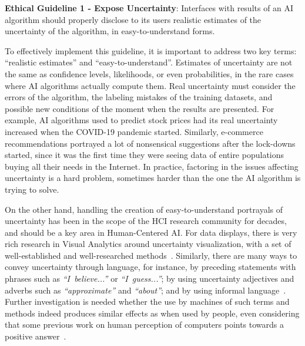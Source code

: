 \documentclass{article}
\begin{document}
\noindent \textbf{Ethical Guideline 1 - Expose Uncertainty}: Interfaces with results of an AI algorithm should properly disclose to its users realistic estimates of the uncertainty of the algorithm, in easy-to-understand forms.

To effectively implement this guideline, it is important to address two key terms: ``realistic estimates'' and ``easy-to-understand''. Estimates of uncertainty are not the same as confidence levels, likelihoods, or even probabilities, in the rare cases where AI algorithms actually compute them. Real uncertainty must consider the errors of the algorithm, the labeling mistakes of the training datasets, and possible new conditions of the moment when the results are presented. For example, AI algorithms used to predict stock prices had its real uncertainty increased when the COVID-19 pandemic started. Similarly, e-commerce recommendations portrayed a lot of nonsensical suggestions after the lock-downs started, since it was the first time they were seeing data of entire populations buying all their needs in the Internet. In practice, factoring in the issues affecting uncertainty is a hard problem, sometimes harder than the one the AI algorithm is trying to solve.

On the other hand, handling the creation of easy-to-understand portrayals of uncertainty has been in the scope of the HCI research community for decades, and should be a key area in Human-Centered AI. For data displays, there is very rich research in Visual Analytics around uncertainty visualization, with a set of well-established and well-researched methods~\cite{griethe2006visualization,brodlie2012review,bonneau2014overview,sacha2015role,hullman2018pursuit}. Similarly, there are many ways to convey uncertainty through language, for instance, by preceding statements with phrases such as \emph{``I~believe...''} or \emph{``I~guess...''}; by using uncertainty adjectives and adverbs such as \emph{``approximate''} and \emph{``about''}; and by using informal language~\cite{heylighendewaele1999formality}. Further investigation is needed whether the use by machines of such terms and methods indeed produces similar effects as when used by people, even considering that some previous work on human perception of computers points towards a positive answer~\cite{reeves1996media,nass2005wired}.





\end{document}
